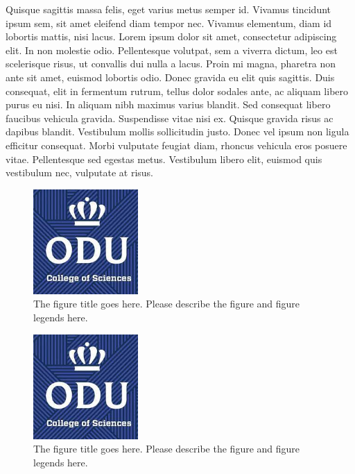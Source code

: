 Quisque sagittis massa felis, eget varius metus semper id. Vivamus tincidunt ipsum sem, sit amet eleifend diam tempor nec. Vivamus elementum, diam id lobortis mattis, nisi lacus. Lorem ipsum dolor sit amet, consectetur adipiscing elit. In non molestie odio. Pellentesque volutpat, sem a viverra dictum, leo est scelerisque risus, ut convallis dui nulla a lacus. Proin mi magna, pharetra non ante sit amet, euismod lobortis odio. Donec gravida eu elit quis sagittis. Duis consequat, elit in fermentum rutrum, tellus dolor sodales ante, ac aliquam libero purus eu nisi. In aliquam nibh maximus varius blandit. Sed consequat libero faucibus vehicula gravida. Suspendisse vitae nisi ex. Quisque gravida risus ac dapibus blandit. Vestibulum mollis sollicitudin justo. Donec vel ipsum non ligula efficitur consequat. Morbi vulputate feugiat diam, rhoncus vehicula eros posuere vitae. Pellentesque sed egestas metus. Vestibulum libero elit, euismod quis vestibulum nec, vulputate at risus. 

\begin{figure}[tbh]
  \centering
  \includegraphics[height=4cm]{Figures/cos1.jpeg}
  \caption[The figure title goes here.]{The figure title goes here. Please describe the figure and figure legends here.}
  \label{fig:cos1_12}
\end{figure}


\begin{figure}[tbh]
  \centering
  \includegraphics[height=4cm]{Figures/cos1.jpeg}
  \caption[The figure title goes here.]{The figure title goes here. Please describe the figure and figure legends here.}
  \label{fig:cos1_13}
\end{figure}

